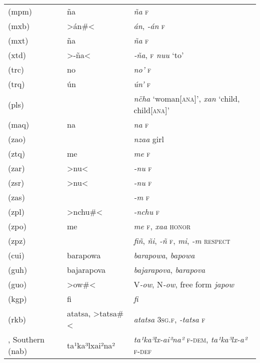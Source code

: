{\begin{longtable}{L{.25\textwidth}L{.25\textwidth}L{.5\textwidth}}
 (mpm)	&	ña	&	\textit{ña} \textsc{f}	\\
 (mxb)	&	>án\#<	&	\textit{án}, \textit{-án} \textsc{f}	\\
 (mxt)	&	ña	&	\textit{ña} \textsc{f}	\\
 (xtd)	&	>-ña<	&	\textit{‑ña}, \textsc{f} \textit{nuu} ‘to’	\\
 (trc)	&	no\textquotesingle{}	&	\textit{no’} \textsc{f}	\\
 (trq)	&	ún\textquotesingle{}	&	\textit{ún’} \textsc{f}	\\
 (pls)	&		&	\textit{nc̈ha} ‘woman[\textsc{ana}]’, \textit{xan} ‘child, child[\textsc{ana}]’	\\
 (maq)	&	na	&	\textit{na} \textsc{f}	\\
 (zao)	&		&	\textit{nzaa} girl	\\
 (ztq)	&	me	&	\textit{me} \textsc{f}	\\
 (zar)	&	>nu<	&	\textit{-nu} \textsc{f}	\\
 (zsr) 	&	>nu<	&	\textit{-nu} \textsc{f}	\\
 (zas)	&		&	\textit{-m} \textsc{f}	\\
 (zpl)	&	>nchu\#<	&	\textit{-nchu} \textsc{f}	\\
 (zpo)	&	me	&	\textit{me} \textsc{f}, \textit{xaa} \textsc{honor}	\\
 (zpz)	&		&	\textit{fiñ}, \textit{ñi}, \textit{-ñ} \textsc{f}, \textit{mi}, \textit{-m} \textsc{respect}	\\
 (cui)	&	barapowa	&	\textit{barapowa}, \textit{bapowa}	\\
 (guh)	&	bajarapova	&	\textit{bajarapova}, \textit{barapova}	\\
 (guo)	&	>ow\#<	&	V\textit{-ow}, N\textit{-ow}, free form \textit{japow}	\\
 (kgp)	&	fi	&	\textit{fi}	\\
 (rkb)	&	atatsa, >tatsa\#<	&	\textit{atatsa} \textsc{3sg.f}, \textit{-tatsa} \textsc{f}	\\
, Southern (nab)	&	ta¹ka³lxai²na²	&	\textit{ta¹ka³lx-ai²na²} \textsc{f-dem}, \textit{ta¹ka³lx-a²} \textsc{f-def}	\\

\end{longtable}}
